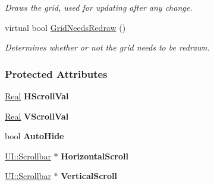 \begin{DoxyCompactItemize}
\begin{DoxyCompactList}\small\item\em Draws the grid, used for updating after any change. \item\end{DoxyCompactList}\item 
\hypertarget{classphys_1_1UI_1_1ScrolledCellGrid_a726ac5925e2b13110ac7bc92788904e0}{
virtual bool \hyperlink{classphys_1_1UI_1_1ScrolledCellGrid_a726ac5925e2b13110ac7bc92788904e0}{GridNeedsRedraw} ()}
\label{classphys_1_1UI_1_1ScrolledCellGrid_a726ac5925e2b13110ac7bc92788904e0}

\begin{DoxyCompactList}\small\item\em Determines whether or not the grid needs to be redrawn. \item\end{DoxyCompactList}\end{DoxyCompactItemize}
\subsubsection*{Protected Attributes}
\begin{DoxyCompactItemize}
\item 
\hypertarget{classphys_1_1UI_1_1ScrolledCellGrid_a0621569548639e6293a4023f4f90f909}{
\hyperlink{namespacephys_af7eb897198d265b8e868f45240230d5f}{Real} {\bfseries HScrollVal}}
\label{classphys_1_1UI_1_1ScrolledCellGrid_a0621569548639e6293a4023f4f90f909}

\item 
\hypertarget{classphys_1_1UI_1_1ScrolledCellGrid_a87f8e96ba30a29c6f466c06ba7f06b91}{
\hyperlink{namespacephys_af7eb897198d265b8e868f45240230d5f}{Real} {\bfseries VScrollVal}}
\label{classphys_1_1UI_1_1ScrolledCellGrid_a87f8e96ba30a29c6f466c06ba7f06b91}

\item 
\hypertarget{classphys_1_1UI_1_1ScrolledCellGrid_a07339986f5695fbaf9ef25a584c1d28f}{
bool {\bfseries AutoHide}}
\label{classphys_1_1UI_1_1ScrolledCellGrid_a07339986f5695fbaf9ef25a584c1d28f}

\item 
\hypertarget{classphys_1_1UI_1_1ScrolledCellGrid_ae979ab2f4889db9517317cc0cf3e37f9}{
\hyperlink{classphys_1_1UI_1_1Scrollbar}{UI::Scrollbar} $\ast$ {\bfseries HorizontalScroll}}
\label{classphys_1_1UI_1_1ScrolledCellGrid_ae979ab2f4889db9517317cc0cf3e37f9}

\item 
\hypertarget{classphys_1_1UI_1_1ScrolledCellGrid_a8bb7423d7d222b977d777098f7fb3217}{
\hyperlink{classphys_1_1UI_1_1Scrollbar}{UI::Scrollbar} $\ast$ {\bfseries VerticalScroll}}
\label{classphys_1_1UI_1_1ScrolledCellGrid_a8bb7423d7d222b977d777098f7fb3217}

\end{DoxyCompactItemize}


